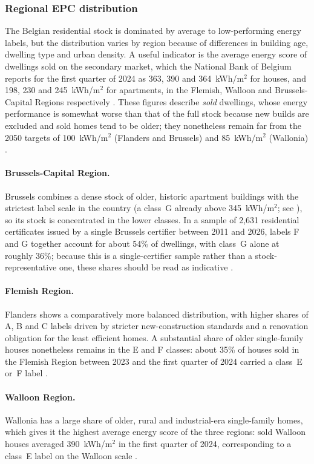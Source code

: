 \subsubsection*{Regional EPC distribution}
The Belgian residential stock is dominated by average to low-performing energy
labels, but the distribution varies by region because of differences in building
age, dwelling type and urban density. A useful indicator is the average energy
score of dwellings sold on the secondary market, which the National Bank of
Belgium reports for the first quarter of 2024 as 363, 390 and 364~kWh/m$^2$ for
houses, and 198, 230 and 245~kWh/m$^2$ for apartments, in the Flemish, Walloon
and Brussels-Capital Regions respectively \cite{nbb_epc_houseprices_2025}. These
figures describe \emph{sold} dwellings, whose energy performance is somewhat
worse than that of the full stock because new builds are excluded and sold homes
tend to be older; they nonetheless remain far from the 2050 targets of
100~kWh/m$^2$ (Flanders and Brussels) and 85~kWh/m$^2$ (Wallonia)
\cite{nbb_epc_houseprices_2025}.

\paragraph{Brussels-Capital Region.} Brussels combines a dense stock of older,
historic apartment buildings with the strictest label scale in the country (a
class~G already above 345~kWh/m$^2$; see ), so its
stock is concentrated in the lower classes. In a sample of 2{,}631 residential
certificates issued by a single Brussels certifier between 2011 and 2026, labels
F and G together account for about 54\% of dwellings, with class~G alone at
roughly 36\%; because this is a single-certifier sample rather than a
stock-representative one, these shares should be read as indicative
\cite{certibru_epc_stats}.

\paragraph{Flemish Region.} Flanders shows a comparatively more balanced
distribution, with higher shares of A, B and C labels driven by stricter
new-construction standards and a renovation obligation for the least efficient
homes. A substantial share of older single-family houses nonetheless remains in
the E and F classes: about 35\% of houses sold in the Flemish Region between 2023
and the first quarter of 2024 carried a class~E or~F label
\cite{nbb_epc_houseprices_2025}.

\paragraph{Walloon Region.} Wallonia has a large share of older, rural and
industrial-era single-family homes, which gives it the highest average energy
score of the three regions: sold Walloon houses averaged 390~kWh/m$^2$ in the
first quarter of 2024, corresponding to a class~E label on the Walloon scale
\cite{nbb_epc_houseprices_2025}.
